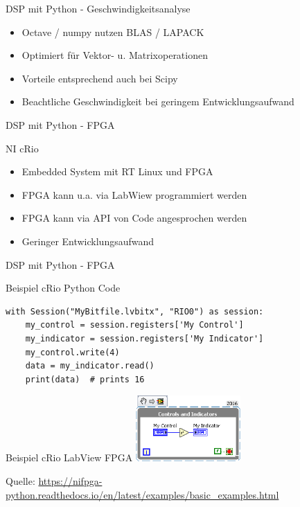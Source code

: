 \documentclass[8pt]{beamer}
\begin{document}
\begin{frame}[label={sec:org5ba8ffc}]{DSP mit Python - Geschwindigkeitsanalyse}
\begin{itemize}
\item Octave / numpy nutzen BLAS / LAPACK
\item Optimiert für Vektor- u. Matrixoperationen
\item Vorteile entsprechend auch bei Scipy
\item Beachtliche Geschwindigkeit bei geringem Entwicklungsaufwand
\end{itemize}
\end{frame}


\begin{frame}[label={sec:org6ab339b}]{DSP mit Python - FPGA}
\begin{block}{NI cRio}
\begin{itemize}
\item Embedded System mit RT Linux und FPGA
\item FPGA kann u.a. via LabWiew programmiert werden
\item FPGA kann via API von Code angesprochen werden
\item Geringer Entwicklungsaufwand
\end{itemize}
\end{block}
\end{frame}


\begin{frame}[fragile,label={sec:org96d236b}]{DSP mit Python - FPGA}
 \begin{block}{Beispiel cRio Python Code}
\begin{verbatim}
with Session("MyBitfile.lvbitx", "RIO0") as session:
    my_control = session.registers['My Control']
    my_indicator = session.registers['My Indicator']
    my_control.write(4)
    data = my_indicator.read()
    print(data)  # prints 16
\end{verbatim}
\end{block}
\begin{block}{Beispiel cRio LabView FPGA}
\hspace{5mm}
\includegraphics[width = 0.3\textwidth]{image/labview_fpga.png}

\vspace{10mm}
Quelle:
\url{https://nifpga-python.readthedocs.io/en/latest/examples/basic\_examples.html}
\end{block}
\end{frame}
\end{document}
